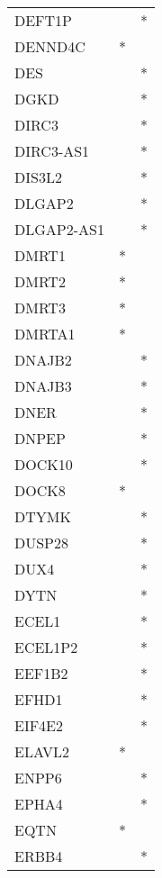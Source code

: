 \begin{longtable}{lcc}
DEFT1P         &           &       * \\
DENND4C        &         * &         \\
DES            &           &       * \\
DGKD           &           &       * \\
DIRC3          &           &       * \\
DIRC3-AS1      &           &       * \\
DIS3L2         &           &       * \\
DLGAP2         &           &       * \\
DLGAP2-AS1     &           &       * \\
DMRT1          &         * &         \\
DMRT2          &         * &         \\
DMRT3          &         * &         \\
DMRTA1         &         * &         \\
DNAJB2         &           &       * \\
DNAJB3         &           &       * \\
DNER           &           &       * \\
DNPEP          &           &       * \\
DOCK10         &           &       * \\
DOCK8          &         * &         \\
DTYMK          &           &       * \\
DUSP28         &           &       * \\
DUX4           &           &       * \\
DYTN           &           &       * \\
ECEL1          &           &       * \\
ECEL1P2        &           &       * \\
EEF1B2         &           &       * \\
EFHD1          &           &       * \\
EIF4E2         &           &       * \\
ELAVL2         &         * &         \\
ENPP6          &           &       * \\
EPHA4          &           &       * \\
EQTN           &         * &         \\
ERBB4          &           &       * \\

\end{longtable}
